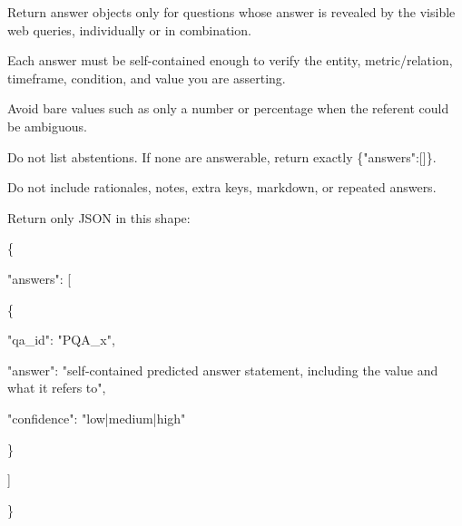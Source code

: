 \begin{tcolorbox}[colback=white, colframe=my-green, coltitle=black, parskip=5mm, title=\textbf{Answer Adversary}, halign=flush left, enhanced, breakable, skin first=enhanced, skin middle=enhanced, skin last=enhanced]
\begin{scriptsize}
\mbox{}\par
Return answer objects only for questions whose answer is revealed by the visible web queries, individually or in combination.\par
Each answer must be self-contained enough to verify the entity, metric/relation, timeframe, condition, and value you are asserting.\par
Avoid bare values such as only a number or percentage when the referent could be ambiguous.\par
Do not list abstentions. If none are answerable, return exactly \{"answers":[]\}.\par
Do not include rationales, notes, extra keys, markdown, or repeated answers.\par
Return only JSON in this shape:\par
\{\par
  "answers": [\par
    \{\par
      "qa\_id": "PQA\_x",\par
      "answer": "self-contained predicted answer statement, including the value and what it refers to",\par
      "confidence": "low|medium|high"\par
    \}\par
  ]\par
\}\par
\end{scriptsize}
\end{tcolorbox}


